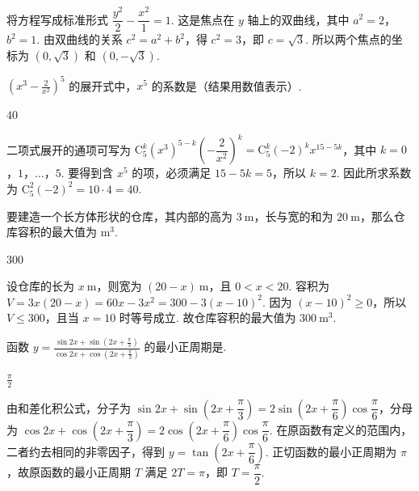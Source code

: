 \documentclass[UTF8,a4paper,oneside,11pt]{ctexbook}
\begin{document}
\begin{solution}
将方程写成标准形式 \(\dfrac{y^2}{2}-\dfrac{x^2}{1}=1\). 这是焦点在 \(y\) 轴上的双曲线，其中 \(a^2=2\)，\(b^2=1\). 由双曲线的关系 \(c^2=a^2+b^2\)，得 \(c^2=3\)，即 \(c=\sqrt3\). 所以两个焦点的坐标为 \((0,\sqrt3)\) 和 \((0,-\sqrt3)\).
\end{solution}

\begin{problem}
\(\left(x^{3} - \frac{2}{x^{2}}\right)^{5}\) 的展开式中，\(x^{5}\) 的系数是（结果用数值表示）\fillinblank{}.
\end{problem}

\begin{answer}
\(40\)
\end{answer}

\begin{solution}
二项式展开的通项可写为
\(\mathrm C_5^k(x^3)^{5-k}\left(-\dfrac{2}{x^2}\right)^k=\mathrm C_5^k(-2)^k x^{15-5k}\)，其中 \(k=0\)，\(1\)，\(\dots\)，\(5\). 要得到含 \(x^5\) 的项，必须满足 \(15-5k=5\)，所以 \(k=2\). 因此所求系数为 \(\mathrm C_5^2(-2)^2=10\cdot4=40\).
\end{solution}

\begin{problem}
要建造一个长方体形状的仓库，其内部的高为 \(3\mathrm{~m}\)，长与宽的和为 \(20\mathrm{~m}\)，那么仓库容积的最大值为\fillinblank{} \(\mathrm{m}^{3}\).
\end{problem}

\begin{answer}
\(300\)
\end{answer}

\begin{solution}
设仓库的长为 \(x\mathrm{~m}\)，则宽为 \((20-x)\mathrm{~m}\)，且 \(0<x<20\). 容积为
\(V=3x(20-x)=60x-3x^2=300-3(x-10)^2\). 因为 \((x-10)^2\geqslant0\)，所以 \(V\leqslant300\)，且当 \(x=10\) 时等号成立. 故仓库容积的最大值为 \(300\mathrm{~m}^3\).
\end{solution}

\begin{problem}
函数 \(y = \frac{\sin 2x + \sin \left(2x + \frac{\pi}{3}\right)}{\cos 2x + \cos \left(2x + \frac{\pi}{3}\right)}\) 的最小正周期是\fillinblank{}.
\end{problem}

\begin{answer}
\(\frac{\pi}{2}\)
\end{answer}

\begin{solution}
由和差化积公式，分子为
\(\sin2x+\sin\left(2x+\dfrac{\pi}{3}\right)=2\sin\left(2x+\dfrac{\pi}{6}\right)\cos\dfrac{\pi}{6}\)，分母为
\(\cos2x+\cos\left(2x+\dfrac{\pi}{3}\right)=2\cos\left(2x+\dfrac{\pi}{6}\right)\cos\dfrac{\pi}{6}\). 在原函数有定义的范围内，二者约去相同的非零因子，得到 \(y=\tan\left(2x+\dfrac{\pi}{6}\right)\). 正切函数的最小正周期为 \(\pi\)，故原函数的最小正周期 \(T\) 满足 \(2T=\pi\)，即 \(T=\dfrac{\pi}{2}\).
\end{solution}
\end{document}
